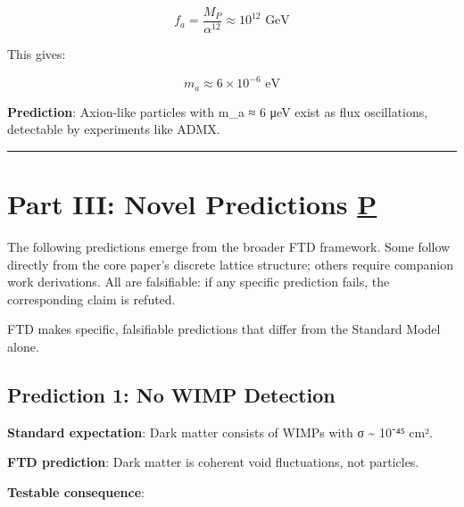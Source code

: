 \documentclass[
  11pt,
  letterpaper,
  twoside,
  openright]{book}
\begin{document}
\[f_a = \frac{M_P}{\alpha^{12}} \approx 10^{12} \text{ GeV}\]

This gives:

\[m_a \approx 6 \times 10^{-6} \text{ eV}\]

\textbf{Prediction}: Axion-like particles with m\_a ≈ 6 μeV exist as
flux oscillations, detectable by experiments like ADMX.

\begin{center}\rule{0.5\linewidth}{0.5pt}\end{center}

\section{\texorpdfstring{Part III: Novel Predictions
\hyperref[p]{P}}{Part III: Novel Predictions P}}\label{part-iii-novel-predictions-p}

\begin{tcolorbox}[enhanced jigsaw, coltitle=black, colbacktitle=quarto-callout-note-color!10!white, toprule=.15mm, colframe=quarto-callout-note-color-frame, arc=.35mm, opacityback=0, bottomtitle=1mm, toptitle=1mm, breakable, colback=white, titlerule=0mm, opacitybacktitle=0.6, title=\textcolor{quarto-callout-note-color}{\faInfo}\hspace{0.5em}{Predictions (Falsifiable)}, rightrule=.15mm, bottomrule=.15mm, leftrule=.75mm, left=2mm]

The following predictions emerge from the broader FTD framework. Some
follow directly from the core paper's discrete lattice structure; others
require companion work derivations. All are falsifiable: if any specific
prediction fails, the corresponding claim is refuted.

\end{tcolorbox}

FTD makes specific, falsifiable predictions that differ from the
Standard Model alone.

\subsection{Prediction 1: No WIMP
Detection}\label{prediction-1-no-wimp-detection}

\textbf{Standard expectation}: Dark matter consists of WIMPs with σ
\textasciitilde{} 10⁻⁴⁵ cm².

\textbf{FTD prediction}: Dark matter is coherent void fluctuations, not
particles.

\textbf{Testable consequence}:
\end{document}
